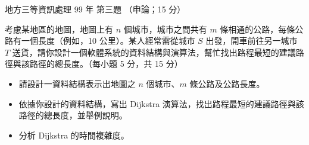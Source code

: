 \begin{pastexam}[label={px:df3-099-ds-03}]{地方三等資訊處理 99 年 第三題}
（申論；15 分）

考慮某地區的地圖，地圖上有 $n$ 個城市，城市之間共有 $m$ 條相通的公路，每條公路有一個長度（例如，10 公里）。某人經常需從城市 $S$ 出發，開車前往另一城市 $T$ 送貨，請你設計一個軟體系統的資料結構與演算法，幫忙找出路程最短的建議路徑與該路徑的總長度。（每小題 5 分，共 15 分）
\begin{itemize}[leftmargin=2.2em]
\item[㈠] 請設計一資料結構表示出地圖之 $n$ 個城市、$m$ 條公路及公路長度。
\item[㈡] 依據你設計的資料結構，寫出 Dijkstra 演算法，找出路程最短的建議路徑與該路徑的總長度，並舉例說明。
\item[㈢] 分析 Dijkstra 的時間複雜度。
\end{itemize}
\end{pastexam}

